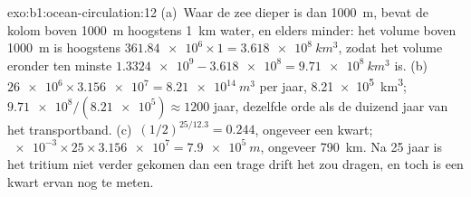 \begin{solution}{exo:b1:ocean-circulation:12}
(a)~Waar de zee dieper is dan \qty{1000}{m}, bevat de kolom boven \qty{1000}{m} hoogstens \qty{1}{km} water, en elders minder: het volume boven \qty{1000}{m} is hoogstens $\num{361.84e6} \times 1 = \qty{3.618e8}{km^3}$, zodat het volume eronder ten minste $\num{1.3324e9} - \num{3.618e8} = \qty{9.71e8}{km^3}$ is. (b)~$\num{26e6} \times \num{3.156e7} = \qty{8.21e14}{m^3}$ per jaar,
\qty{8.21e5}{km^3}; $\num{9.71e8}/(\num{8.21e5}) \approx 1200$ jaar, dezelfde orde als de duizend jaar van het transportband. (c)~$(1/2)^{25/12.3} = 0.244$, ongeveer een kwart; $\num{e-3} \times 25 \times \num{3.156e7} = \qty{7.9e5}{m}$, ongeveer \qty{790}{km}. Na 25 jaar is het tritium niet verder gekomen dan een trage drift het zou dragen, en toch is een kwart ervan nog te meten.
\end{solution}

